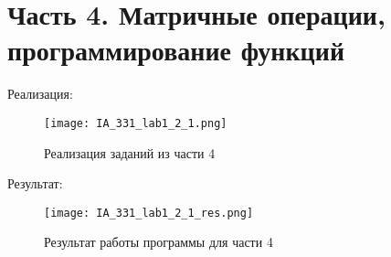 \chapter{Часть 4. Матричные операции, программирование функций}
\label{ch:chap4}

Реализация:\\

\begin{figure}[ht]
    \centering
    \texttt{[image: IA\_331\_lab1\_2\_1.png]}
    \caption{Реализация заданий из части 4}
    \label{fig:open_audio}
\end{figure}

Результат:\\

\begin{figure}[ht]
    \centering
    \texttt{[image: IA\_331\_lab1\_2\_1\_res.png]}
    \caption{Результат работы программы для части 4}
    \label{fig:open_audio}
\end{figure}

\endinput